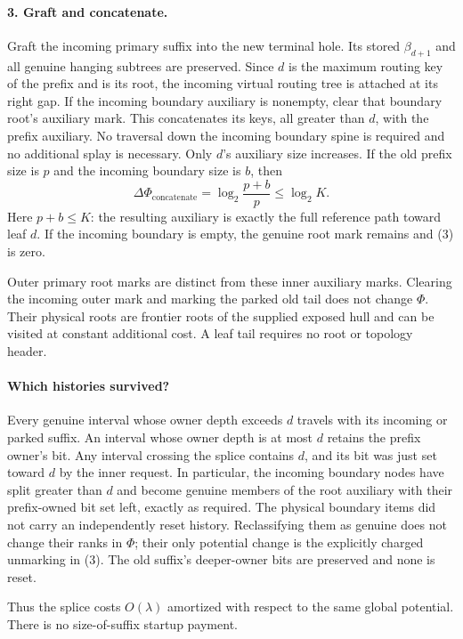 \documentclass[11pt]{article}
\begin{document}
\paragraph{3. Graft and concatenate.}
Graft the incoming primary suffix into the new terminal hole. Its
stored $\beta_{d+1}$ and all genuine hanging subtrees are preserved.
Since $d$ is the maximum routing key of the prefix and is its root,
the incoming virtual routing tree is attached at its right gap.
If the incoming boundary auxiliary is nonempty, clear that boundary
root's auxiliary mark. This concatenates its keys, all greater than
$d$, with the prefix auxiliary. No traversal down the incoming
boundary spine is required and no additional splay is necessary.
Only $d$'s auxiliary size increases. If the old prefix size is $p$
and the incoming boundary size is $b$, then
\[
 \Delta\Phi_{\mathrm{concatenate}}
 =\log_2\frac{p+b}{p}\le\log_2 K.                \tag{3}
\]
Here $p+b\le K$: the resulting auxiliary is exactly the full reference
path toward leaf $d$. If the incoming boundary is empty, the genuine
root mark remains and (3) is zero.

Outer primary root marks are distinct from these inner auxiliary marks.
Clearing the incoming outer mark and marking the parked old tail does
not change $\Phi$. Their physical roots are frontier roots of the
supplied exposed hull and can be visited at constant additional cost.
A leaf tail requires no root or topology header.

\paragraph{Which histories survived?}
Every genuine interval whose owner depth exceeds $d$ travels with its
incoming or parked suffix. An interval whose owner depth is at most
$d$ retains the prefix owner's bit. Any interval crossing the splice
contains $d$, and its bit was just set toward $d$ by the inner request.
In particular, the incoming boundary nodes have split greater than
$d$ and become genuine members of the root auxiliary with their
prefix-owned bit set left, exactly as required. The physical boundary
items did not carry an independently reset history. Reclassifying them
as genuine does not change their ranks in $\Phi$; their only potential
change is the explicitly charged unmarking in (3). The old suffix's
deeper-owner bits are preserved and none is reset.

Thus the splice costs $O(\lambda)$ amortized with respect to the same
global potential. There is no size-of-suffix startup payment.
\end{document}
